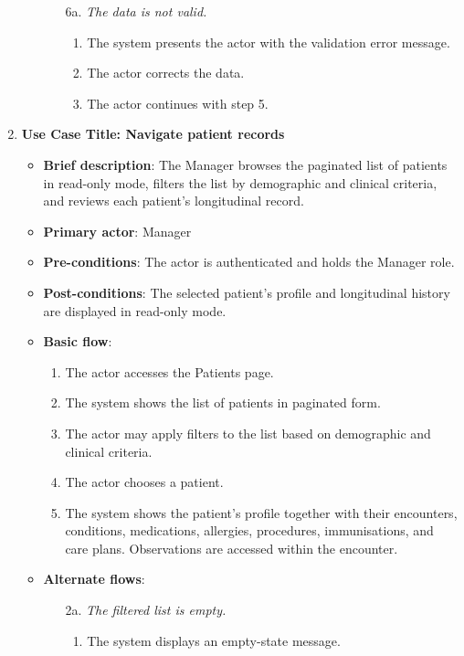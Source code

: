 \begin{enumerate}
\begin{itemize}
\begin{itemize}
\begin{enumerate}
        \end{enumerate}
        \item[6a.] \textit{The data is not valid.}
        \begin{enumerate}
            \item The system presents the actor with the validation error message.
            \item The actor corrects the data.
            \item The actor continues with step 5.
        \end{enumerate}
    \end{itemize}
\end{itemize}

\vspace{0.5em}

\item \textbf{Use Case Title: Navigate patient records}
\begin{itemize}
    \item \textbf{Brief description}: The Manager browses the paginated list of patients in read-only mode, filters the list by demographic and clinical criteria, and reviews each patient's longitudinal record.
    \item \textbf{Primary actor}: Manager
    \item \textbf{Pre-conditions}: The actor is authenticated and holds the Manager role.
    \item \textbf{Post-conditions}: The selected patient's profile and longitudinal history are displayed in read-only mode.
    \item \textbf{Basic flow}:
    \begin{enumerate}
        \item The actor accesses the Patients page.
        \item The system shows the list of patients in paginated form.
        \item The actor may apply filters to the list based on demographic and clinical criteria.
        \item The actor chooses a patient.
        \item The system shows the patient's profile together with their encounters, conditions, medications, allergies, procedures, immunisations, and care plans. Observations are accessed within the encounter.
    \end{enumerate}
    \item \textbf{Alternate flows}:
    \begin{itemize}
        \item[2a.] \textit{The filtered list is empty.}
        \begin{enumerate}
            \item The system displays an empty-state message.
        \end{enumerate}
    \end{itemize}
\end{itemize}


\end{enumerate}
